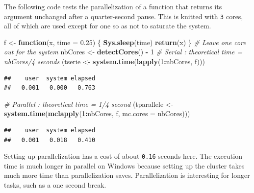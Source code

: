 \documentclass[
  12pt,
  american,
  a4paper,
  extrafontsizes,onecolumn,openright
  ]{memoir}
\newenvironment{Shaded}{\begin{snugshade}}{\end{snugshade}}
\newcommand{\AttributeTok}[1]{\textcolor[rgb]{0.13,0.29,0.53}{#1}}
\newcommand{\CommentTok}[1]{\textcolor[rgb]{0.56,0.35,0.01}{\textit{#1}}}
\newcommand{\ControlFlowTok}[1]{\textcolor[rgb]{0.13,0.29,0.53}{\textbf{#1}}}
\newcommand{\DecValTok}[1]{\textcolor[rgb]{0.00,0.00,0.81}{#1}}
\newcommand{\FloatTok}[1]{\textcolor[rgb]{0.00,0.00,0.81}{#1}}
\newcommand{\FunctionTok}[1]{\textcolor[rgb]{0.13,0.29,0.53}{\textbf{#1}}}
\newcommand{\NormalTok}[1]{#1}
\newcommand{\OtherTok}[1]{\textcolor[rgb]{0.56,0.35,0.01}{#1}}
\newcommand{\SpecialCharTok}[1]{\textcolor[rgb]{0.81,0.36,0.00}{\textbf{#1}}}
\begin{document}
\normalsize

The following code tests the parallelization of a function that returns its argument unchanged after a quarter-second pause.
This is knitted with \texttt{3} cores, all of which are used except for one so as not to saturate the system.

\scriptsize

\begin{Shaded}
\begin{Highlighting}[]
\NormalTok{f }\OtherTok{\textless{}{-}} \ControlFlowTok{function}\NormalTok{(x, }\AttributeTok{time =} \FloatTok{0.25}\NormalTok{) \{}
    \FunctionTok{Sys.sleep}\NormalTok{(time)}
    \FunctionTok{return}\NormalTok{(x)}
\NormalTok{\}}
\CommentTok{\# Leave one core out for the system}
\NormalTok{nbCores }\OtherTok{\textless{}{-}} \FunctionTok{detectCores}\NormalTok{() }\SpecialCharTok{{-}} \DecValTok{1}
\CommentTok{\# Serial : theoretical time = nbCores/4 seconds}
\NormalTok{(tserie }\OtherTok{\textless{}{-}} \FunctionTok{system.time}\NormalTok{(}\FunctionTok{lapply}\NormalTok{(}\DecValTok{1}\SpecialCharTok{:}\NormalTok{nbCores, f)))}
\end{Highlighting}
\end{Shaded}

\begin{verbatim}
##    user  system elapsed 
##   0.001   0.000   0.763
\end{verbatim}

\begin{Shaded}
\begin{Highlighting}[]
\CommentTok{\# Parallel : theoretical time = 1/4 second}
\NormalTok{(tparallele }\OtherTok{\textless{}{-}} \FunctionTok{system.time}\NormalTok{(}\FunctionTok{mclapply}\NormalTok{(}\DecValTok{1}\SpecialCharTok{:}\NormalTok{nbCores, f, }\AttributeTok{mc.cores =}\NormalTok{ nbCores)))}
\end{Highlighting}
\end{Shaded}

\begin{verbatim}
##    user  system elapsed 
##   0.001   0.018   0.410
\end{verbatim}

\normalsize

Setting up parallelization has a cost of about \texttt{0.16} seconds here.
The execution time is much longer in parallel on Windows because setting up the cluster takes much more time than parallelization saves.
Parallelization is interesting for longer tasks, such as a one second break.
\end{document}
